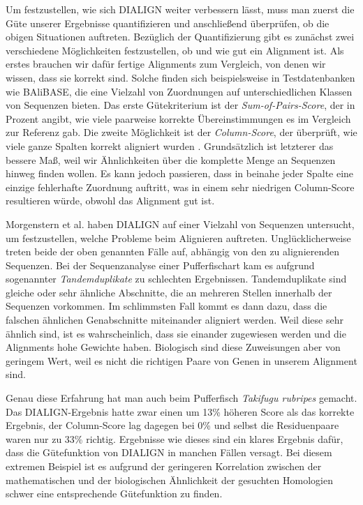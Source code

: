 Um festzustellen, wie sich DIALIGN weiter verbessern lässt, muss man zuerst die Güte unserer Ergebnisse quantifizieren und anschließend überprüfen, ob die obigen Situationen auftreten. Bezüglich der Quantifizierung gibt es zunächst zwei verschiedene Möglichkeiten festzustellen, ob und wie gut ein Alignment ist. Als erstes brauchen wir dafür fertige Alignments zum Vergleich, von denen wir wissen, dass sie korrekt sind. Solche finden sich beispielsweise in Testdatenbanken wie BAliBASE, die eine Vielzahl von Zuordnungen auf unterschiedlichen Klassen von Sequenzen bieten. Das erste Gütekriterium ist der \emph{Sum-of-Pairs-Score}, der in Prozent angibt, wie viele paarweise korrekte Übereinstimmungen es im Vergleich zur Referenz gab. Die zweite Möglichkeit ist der \emph{Column-Score}, der überprüft, wie viele ganze Spalten korrekt aligniert wurden \cite{mpps06}. Grundsätzlich ist letzterer das bessere Maß, weil wir Ähnlichkeiten über die komplette Menge an Sequenzen hinweg finden wollen. Es kann jedoch passieren, dass in beinahe jeder Spalte eine einzige fehlerhafte Zuordnung auftritt, was in einem sehr niedrigen Column-Score resultieren würde, obwohl das Alignment gut ist.

Morgenstern et al. haben DIALIGN auf einer Vielzahl von Sequenzen untersucht, um festzustellen, welche Probleme beim Alignieren auftreten\cite{mpps06}. Unglücklicherweise treten beide der oben genannten Fälle auf, abhängig von den zu alignierenden Sequenzen. Bei der Sequenzanalyse einer Pufferfischart kam es aufgrund sogenannter \emph{Tandemduplikate} zu schlechten Ergebnissen. Tandemduplikate sind gleiche oder sehr ähnliche Abschnitte, die an mehreren Stellen innerhalb der Sequenzen vorkommen. Im schlimmsten Fall kommt es dann dazu, dass die falschen ähnlichen Genabschnitte miteinander aligniert werden. Weil diese sehr ähnlich sind, ist es wahrscheinlich, dass sie einander zugewiesen werden und die Alignments hohe Gewichte haben. Biologisch sind diese Zuweisungen aber von geringem Wert, weil es nicht die richtigen Paare von Genen in unserem Alignment sind. 

Genau diese Erfahrung hat man auch beim Pufferfisch \emph{Takifugu rubripes} gemacht. Das DIALIGN-Ergebnis hatte zwar einen um 13\% höheren Score als das korrekte Ergebnis, der Column-Score lag dagegen bei 0\% und selbst die Residuenpaare waren nur zu 33\% richtig. Ergebnisse wie dieses sind ein klares Ergebnis dafür, dass die Gütefunktion von DIALIGN in manchen Fällen versagt. Bei diesem extremen Beispiel ist es aufgrund der geringeren Korrelation zwischen der mathematischen und der biologischen Ähnlichkeit der gesuchten Homologien schwer eine entsprechende Gütefunktion zu finden. 

